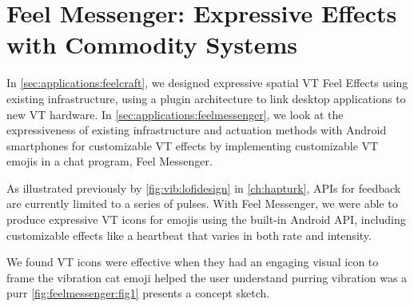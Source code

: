 \section{Feel Messenger: Expressive Effects with Commodity Systems}
\label{sec:applications:feelmessenger}
\noindent
In \autoref{sec:applications:feelcraft}, we designed expressive spatial VT Feel Effects using existing infrastructure, using a plugin architecture to link desktop applications to new VT hardware.
In \autoref{sec:applications:feelmessenger}, we look at the expressiveness of existing infrastructure and actuation methods with Android smartphones for customizable VT effects by implementing customizable VT emojis in a chat program, Feel Messenger.

As illustrated previously by \autoref{fig:vib:lofidesign} in \autoref{ch:hapturk}, APIs for  feedback are currently limited to a series of pulses.
With Feel Messenger, we were able to produce expressive VT icons for emojis using the built-in Android API, including customizable effects like a heartbeat that varies in both rate and intensity.

We found VT icons were effective  when they had an engaging visual icon to frame the vibration cat emoji helped the user understand purring vibration was a purr
\autoref{fig:feelmessenger:fig1} presents a concept sketch.

